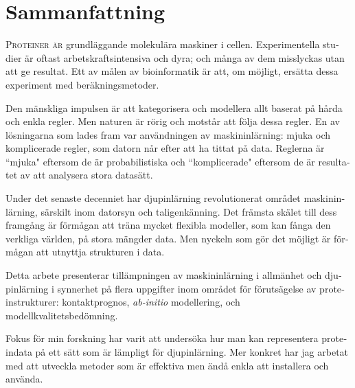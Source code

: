 \chapter*{Sammanfattning}
\begin{otherlanguage}{swedish}
\lettrine[lines=3, lhang=0.15, nindent=0em, findent=2pt]{\color{Maroon}P}{roteiner är }
grundläggande molekulära maskiner i cellen. Experimentella studier är oftast arbetskraftsintensiva och dyra; och många av dem misslyckas utan att ge resultat. Ett av målen av bioinformatik är att, om möjligt, ersätta dessa experiment med beräkningsmetoder.

Den mänskliga impulsen är att kategorisera och modellera allt baserat på hårda och enkla regler.
Men naturen är rörig och motstår att följa dessa regler.
En av lösningarna som lades fram var användningen av maskininlärning: mjuka och komplicerade regler, som datorn når efter att ha tittat på data.
Reglerna är ``mjuka" eftersom de är probabilistiska och ``komplicerade" eftersom de är resultatet av att analysera stora datasätt.

Under det senaste decenniet har djupinlärning revolutionerat området maskininlärning, särskilt inom datorsyn och taligenkänning. Det främsta skälet till dess framgång är förmågan att träna mycket flexibla modeller, som kan fånga den verkliga världen, på stora mängder data. Men nyckeln som gör det möjligt är förmågan att utnyttja strukturen i data.

Detta arbete presenterar tillämpningen av maskininlärning i allmänhet och djupinlärning i synnerhet på flera uppgifter inom området för förutsägelse av proteinstrukturer: kontaktprognos, \emph{ab-initio} modellering, och modellkvalitetsbedömning.

Fokus för min forskning har varit att undersöka hur man kan representera proteindata på ett sätt som är lämpligt för djupinlärning. Mer konkret har jag arbetat med att utveckla metoder som är effektiva men ändå enkla att installera och använda.
\end{otherlanguage}